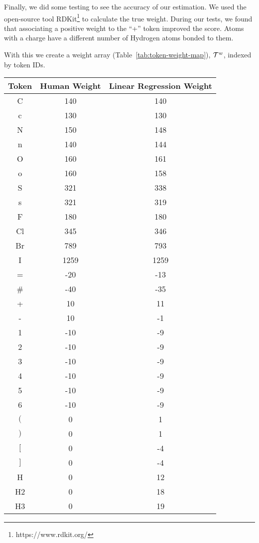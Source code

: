 \documentclass[../Document.tex]{subfiles}
\begin{document}
Finally, we did some testing to see the accuracy of our estimation.
We used the open-source tool RDKit\footnote{https://www.rdkit.org/} to calculate the true weight.
During our tests, we found that associating a positive weight to the ``+'' token improved the score.
Atoms with a charge have a different number of Hydrogen atoms bonded to them.

With this we create a weight array (Table~\ref{tab:token-weight-map}), ${\cal T}^w$,  indexed by token IDs.

\begin{table}[ht]
    \centering
    \begin{tabular}{c|c|c}
        Token & Human Weight & Linear Regression Weight\\
        \hline
        C & 140 & 140\\
        c & 130 & 130\\
        N & 150 & 148\\
        n & 140 & 144\\
        O & 160 & 161\\
        o & 160 & 158\\
        S & 321 & 338\\
        s & 321 & 319\\
        F & 180 & 180\\
        Cl & 345 & 346\\
        Br & 789 & 793\\
        I & 1259 & 1259\\
        = & -20 & -13\\
        \# & -40 & -35\\
        + & 10 & 11\\
        - & 10 & -1\\
        1 & -10 & -9\\
        2 & -10 & -9\\
        3 & -10 & -9\\
        4 & -10 & -9\\
        5 & -10 & -9\\
        6 & -10 & -9\\
        $($ & 0 & 1\\
        $)$ & 0 & 1\\
        $[$ & 0 & -4\\
        $]$ & 0 & -4\\
        H & 0 & 12\\
        H2 & 0 & 18\\
        H3 & 0 & 19\\

\end{tabular}
\end{table}
\end{document}
